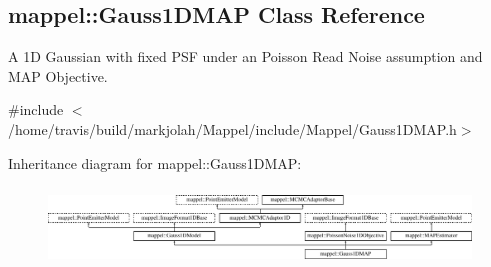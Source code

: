\hypertarget{classmappel_1_1Gauss1DMAP}{}\subsection{mappel\+:\+:Gauss1\+D\+M\+AP Class Reference}
\label{classmappel_1_1Gauss1DMAP}


A 1D Gaussian with fixed P\+SF under an Poisson Read Noise assumption and M\+AP Objective.  




{\ttfamily \#include $<$/home/travis/build/markjolah/\+Mappel/include/\+Mappel/\+Gauss1\+D\+M\+A\+P.\+h$>$}

Inheritance diagram for mappel\+:\+:Gauss1\+D\+M\+AP\+:\begin{figure}[H]
\begin{center}
\leavevmode
\includegraphics[height=2.113208cm]{classmappel_1_1Gauss1DMAP}
\end{center}
\end{figure}
